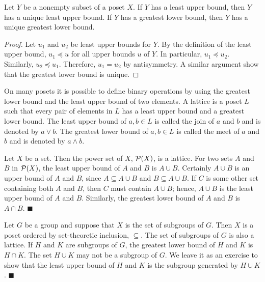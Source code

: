 \begin{theorem}
Let $Y$ be a nonempty subset of a poset $X$. If $Y$ has a least upper bound, then $Y$ has a unique least upper bound. If $Y$ has a greatest lower bound, then $Y$ has a unique greatest lower bound.
\end{theorem} 

\begin{proof}
Let $u_1$ and $u_2$ be least upper bounds for $Y$. By the definition
of the least upper bound, $u_1 \preceq u$ for all upper bounds $u$ of
$Y$. In particular, $u_1 \preceq u_2$. Similarly, $u_2 \preceq u_1$.
Therefore, $u_1 = u_2$ by antisymmetry.  A similar argument show that
the greatest lower bound is unique.
\end{proof}
 
 
\medskip
 
 
On many posets it is possible to define binary operations
by using the greatest lower bound and the least upper bound of two
elements. A {\bfi lattice\/} is a poset $L$
such that every pair of elements in $L$ has a least upper bound and a
greatest lower bound. The least upper bound of $a, b \in L$ is called
the {\bfi join\/}\label{join} of $a$ and $b$ and is denoted 
by $a \vee b$.  The greatest lower bound of $a, b \in L$ is called 
the {\bfi meet\/}\label{meet} of $a$ and $b$ and is denoted 
by $a \wedge b$.
 
 
\medskip
 
 
Let $X$ be a set. Then the power set of $X$, ${\cal P}(X)$, is a
lattice. For two sets $A$ and $B$ in ${\cal P}(X)$, the least upper
bound of $A$ and $B$ is $A \cup B$. Certainly $A \cup B$ is an upper
bound of $A$ and $B$, since $A \subseteq A \cup B$ and $B \subseteq A
\cup B$.  If $C$ is some other set containing both $A$ and $B$, then
$C$ must contain $A \cup B$; hence, $A \cup B$ is the least upper bound
of $A$ and $B$. Similarly,  the greatest lower bound of $A$ and $B$ is
$A \cap B$.
\hspace{\fill} $\blacksquare$
 
 
\medskip
 
 
Let $G$ be a group and suppose that $X$ is the set of subgroups of
$G$.  Then $X$ is a poset ordered by set-theoretic inclusion,
$\subseteq$.  The set of subgroups of $G$ is also a lattice.  If $H$
and $K$ are subgroups of $G$, the greatest lower bound of $H$ and $K$
is $H \cap K$. The set $H \cup K$ may not be a subgroup of $G$.  We
leave it as an exercise to show that the least upper bound of $H$ and
$K$ is the subgroup generated by $H \cup K$. 
\hspace{\fill} $\blacksquare$
 
